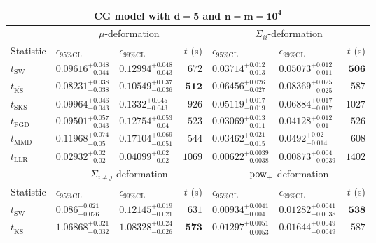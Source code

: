 \begin{tabular}{l|llr|llr}
	\toprule
	\multicolumn{7}{c}{{\bf CG model with $\mathbf{d=5}$ and $\mathbf{n=m=10^{4}}$}} \\
	\toprule
	\multicolumn{1}{c}{} & \multicolumn{3}{c}{$\mu$-deformation} & \multicolumn{3}{c}{$\Sigma_{ii}$-deformation} \\
	Statistic & $\epsilon_{95\%\mathrm{CL}}$ & $\epsilon_{99\%\mathrm{CL}}$ & $t$ (s) & $\epsilon_{95\%\mathrm{CL}}$ & $\epsilon_{99\%\mathrm{CL}}$ & $t$ (s) \\
	\midrule
	$t_{\mathrm{SW}}$ & $0.09616_{-0.044}^{+0.048}$ & $0.12994_{-0.043}^{+0.048}$ & $672$ & $0.03714_{-0.013}^{+0.012}$ & $0.05073_{-0.011}^{+0.012}$ & ${\mathbf{506}}$ \\
	$t_{\overline{\mathrm{KS}}}$ & ${\mathbf{0.08231_{-0.038}^{+0.038}}}$ & ${\mathbf{0.10549_{-0.036}^{+0.037}}}$ & ${\mathbf{512}}$ & $0.06456_{-0.027}^{+0.026}$ & $0.08369_{-0.025}^{+0.025}$ & $587$ \\
	$t_{\mathrm{SKS}}$ & $0.09964_{-0.043}^{+0.046}$ & $0.1332_{-0.043}^{+0.045}$ & $926$ & $0.05119_{-0.019}^{+0.017}$ & $0.06884_{-0.017}^{+0.017}$ & $1027$ \\
	$t_{\mathrm{FGD}}$ & $0.09501_{-0.043}^{+0.057}$ & $0.12754_{-0.04}^{+0.053}$ & $523$ & ${\mathbf{0.03069_{-0.011}^{+0.013}}}$ & ${\mathbf{0.04128_{-0.01}^{+0.012}}}$ & $526$ \\
	$t_{\mathrm{MMD}}$ & $0.11968_{-0.05}^{+0.074}$ & $0.17104_{-0.051}^{+0.069}$ & $544$ & $0.03462_{-0.015}^{+0.021}$ & $0.0492_{-0.014}^{+0.02}$ & $608$ \\
	$t_{\mathrm{LLR}}$ & $0.02932_{-0.02}^{+0.02}$ & $0.04099_{-0.02}^{+0.02}$ & $1069$ & $0.00622_{-0.0038}^{+0.0039}$ & $0.00873_{-0.0039}^{+0.004}$ & $1402$ \\
	\toprule
	\multicolumn{1}{c}{} & \multicolumn{3}{c}{$\Sigma_{i\neq j}$-deformation} & \multicolumn{3}{c}{$\rm{pow}_{+}$-deformation} \\
	Statistic & $\epsilon_{95\%\mathrm{CL}}$ & $\epsilon_{99\%\mathrm{CL}}$ & $t$ (s) & $\epsilon_{95\%\mathrm{CL}}$ & $\epsilon_{99\%\mathrm{CL}}$ & $t$ (s) \\
	\midrule
	$t_{\mathrm{SW}}$ & $0.086_{-0.026}^{+0.021}$ & $0.12145_{-0.021}^{+0.019}$ & $631$ & $0.00934_{-0.004}^{+0.0041}$ & $0.01282_{-0.0038}^{+0.0041}$ & ${\mathbf{538}}$ \\
	$t_{\overline{\mathrm{KS}}}$ & $1.06868_{-0.032}^{+0.021}$ & $1.08328_{-0.026}^{+0.024}$ & ${\mathbf{573}}$ & $0.01297_{-0.0053}^{+0.0051}$ & $0.01644_{-0.0049}^{+0.0049}$ & $587$ \\

\end{tabular}
